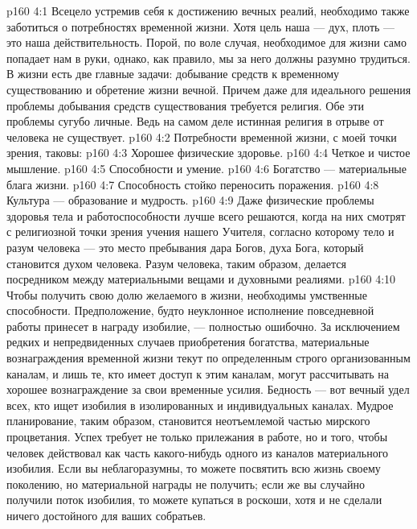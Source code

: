 \vs p160 4:1 Всецело устремив себя к достижению вечных реалий, необходимо также заботиться о потребностях временной жизни. Хотя цель наша --- дух, плоть --- это наша действительность. Порой, по воле случая, необходимое для жизни само попадает нам в руки, однако, как правило, мы за него должны разумно трудиться. В жизни есть две главные задачи: добывание средств к временному существованию и обретение жизни вечной. Причем даже для идеального решения проблемы добывания средств существования требуется религия. Обе эти проблемы сугубо личные. Ведь на самом деле истинная религия в отрыве от человека не существует.
\vs p160 4:2 \pc Потребности временной жизни, с моей точки зрения, таковы:
\vs p160 4:3 \bibnobreakspace Хорошее физические здоровье.
\vs p160 4:4 \bibnobreakspace Четкое и чистое мышление.
\vs p160 4:5 \bibnobreakspace Способности и умение.
\vs p160 4:6 \bibnobreakspace Богатство --- материальные блага жизни.
\vs p160 4:7 \bibnobreakspace Способность стойко переносить поражения.
\vs p160 4:8 \bibnobreakspace Культура --- образование и мудрость.
\vs p160 4:9 \pc Даже физические проблемы здоровья тела и работоспособности лучше всего решаются, когда на них смотрят с религиозной точки зрения учения нашего Учителя, согласно которому тело и разум человека --- это место пребывания дара Богов, духа Бога, который становится духом человека. Разум человека, таким образом, делается посредником между материальными вещами и духовными реалиями.
\vs p160 4:10 \pc Чтобы получить свою долю желаемого в жизни, необходимы умственные способности. Предположение, будто неуклонное исполнение повседневной работы принесет в награду изобилие, --- полностью ошибочно. За исключением редких и непредвиденных случаев приобретения богатства, материальные вознаграждения временной жизни текут по определенным строго организованным каналам, и лишь те, кто имеет доступ к этим каналам, могут рассчитывать на хорошее вознаграждение за свои временные усилия. Бедность --- вот вечный удел всех, кто ищет изобилия в изолированных и индивидуальных каналах. Мудрое планирование, таким образом, становится неотъемлемой частью мирского процветания. Успех требует не только прилежания в работе, но и того, чтобы человек действовал как часть какого\hyp{}нибудь одного из каналов материального изобилия. Если вы неблагоразумны, то можете посвятить всю жизнь своему поколению, но материальной награды не получить; если же вы случайно получили поток изобилия, то можете купаться в роскоши, хотя и не сделали ничего достойного для ваших собратьев.
